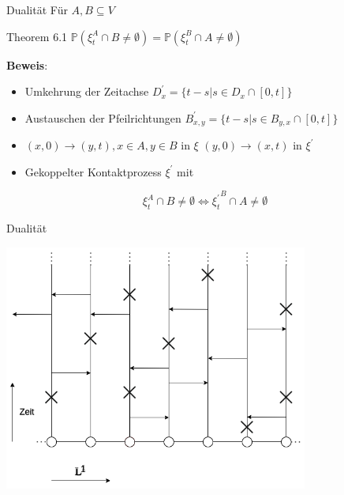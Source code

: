\documentclass[11pt]{beamer}
\begin{document}
\begin{frame}{Dualität}
    Für $A, B \subseteq V$
    \begin{block}{Theorem 6.1}
        $\mathbb{P}(\xi_t^A \cap B \not= \emptyset) = \mathbb{P}(\xi_t^B \cap A \not = \emptyset)$
    \end{block}
    \textbf{Beweis}:
    \\
    \begin{itemize}
        \item<2-> Umkehrung der Zeitachse $D_x^\prime = \{t - s | s \in D_x \cap [0, t] \}$
        \item<3-> Austauschen der Pfeilrichtungen $B_{x, y}^\prime = \{ t - s | s \in B_{y, x} \cap [0, t]\}$
        \item<4-> $(x, 0) \to (y, t), x \in A, y \in B$ in $\xi$ \iff $(y, 0) \to (x, t)$ in $\xi^\prime$
        \item<5-> Gekoppelter Kontaktprozess $\xi^\prime$ mit 
    \end{itemize}
    \begin{equation*}
        \xi_t^A \cap B \not= \emptyset \iff {\xi_t^\prime}^B \cap A \not = \emptyset
    \end{equation*}
\end{frame}

\begin{frame}{Dualität}
    \begin{center}
        \includegraphics[width=0.75\textwidth]{images/contact process arrows.png}
    \end{center}
\end{frame}
\end{document}
